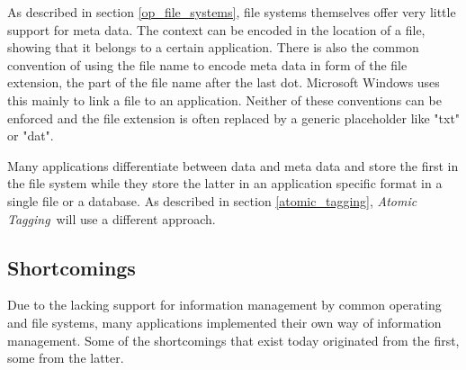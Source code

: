 \documentclass[12pt,a4paper,notitlepage,twocolumn,oneside]{article}
\newcommand{\at}{{\emph{Atomic Tagging}}}
\begin{document}
As described in section \ref{op_file_systems}, file systems themselves offer very little support for meta data. The context can be encoded in the location of a file, showing that it belongs to a certain application. There is also the common convention of using the file name to encode meta data in form of the file extension, the part of the file name after the last dot. Microsoft Windows uses this mainly to link a file to an application. Neither of these conventions can be enforced and the file extension is often replaced by a generic placeholder like "txt" or "dat".

Many applications differentiate between data and meta data and store the first in the file system while they store the latter in an application specific format in a single file or a database. As described in section \ref{atomic_tagging}, \at\ will use a different approach.

\subsection{Shortcomings}\label{shortcomings}
Due to the lacking support for information management by common operating and file systems, many applications implemented their own way of information management. Some of the shortcomings that exist today originated from the first, some from the latter. 
\end{document}
